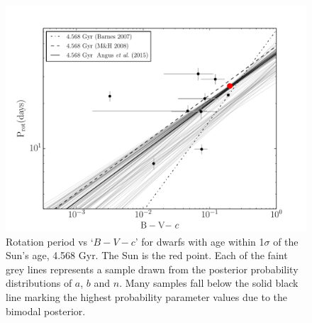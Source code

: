 \documentclass[useAMS, usenatbib]{mn2e}
\begin{document}
\begin{figure}
\begin{center}
\includegraphics[width=6in, clip=true, trim=0 0 0.5in 0]{p_vs_bv_solar.pdf}
\caption{Rotation period vs `$B-V-c$' for dwarfs with age within 1$\sigma$ of
	the Sun's age, 4.568 Gyr.
	The Sun is the red point.
	Each of the faint grey lines represents a
	sample drawn from the posterior probability distributions of $a$, $b$ and $n$.
	Many samples fall below the solid black line marking the highest
	probability parameter values due to the bimodal posterior.
\label{fig:p_vs_bv_solar}}
\end{center}
\end{figure}
\end{document}
